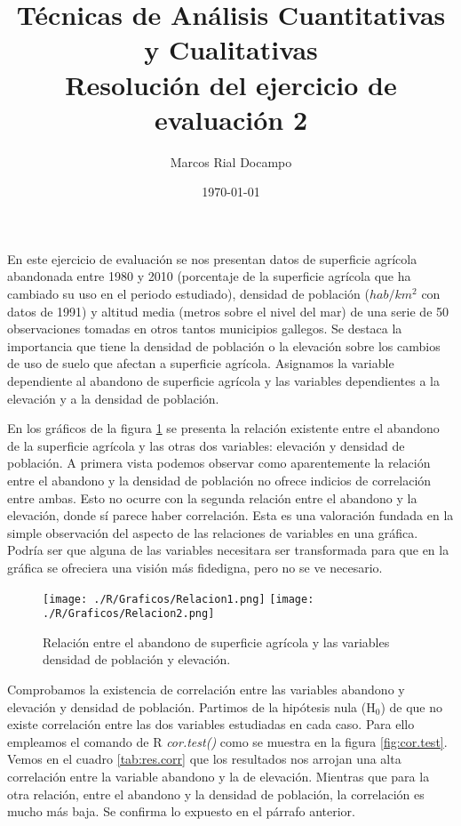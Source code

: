 \documentclass[11pt,a4paper]{article}
\author{Marcos Rial Docampo}
\title{Técnicas de Análisis Cuantitativas y Cualitativas\\Resolución del ejercicio de evaluación 2}
\date{\small{\today}}
\begin{document}
\maketitle

En este ejercicio de evaluación se nos presentan datos de superficie agrícola abandonada entre 1980 y 2010 (porcentaje de la superficie agrícola que ha cambiado su uso en el periodo estudiado), densidad de población ($hab/km^{2}$ con datos de 1991) y altitud media (metros sobre el nivel del mar) de una serie de 50 observaciones tomadas en otros tantos municipios gallegos. Se destaca la importancia que tiene la densidad de población o la elevación sobre los cambios de uso de suelo que afectan a superficie agrícola. Asignamos la variable dependiente al abandono de superficie agrícola y las variables dependientes a la elevación y a la densidad de población.

En los gráficos de la figura \ref{fig:graficas} se presenta la relación existente entre el abandono de la superficie agrícola y las otras dos variables: elevación y densidad de población. A primera vista podemos observar como aparentemente la relación entre el abandono y la densidad de población no ofrece indicios de correlación entre ambas. Esto no ocurre con la segunda relación entre el abandono y la elevación, donde sí parece haber correlación. Esta es una valoración fundada en la simple observación del aspecto de las relaciones de variables en una gráfica. Podría ser que alguna de las variables necesitara ser transformada para que en la gráfica se ofreciera una visión más fidedigna, pero no se ve necesario.


\begin{figure}
	\centering
	\texttt{[image: ./R/Graficos/Relacion1.png]}
	\texttt{[image: ./R/Graficos/Relacion2.png]}
	\caption{Relación entre el abandono de superficie agrícola y las variables densidad de población y elevación.}
	\label{fig:graficas}
\end{figure}

Comprobamos la existencia de correlación entre las variables abandono y elevación y densidad de población. Partimos de la hipótesis nula (H$_0$) de que no existe correlación entre las dos variables estudiadas en cada caso. Para ello empleamos el comando de R \textit{cor.test()} como se muestra en la figura \ref{fig:cor.test}. Vemos en el cuadro \ref{tab:res.corr} que los resultados nos arrojan una alta correlación entre la variable abandono y la de elevación. Mientras que para la otra relación, entre el abandono y la densidad de población, la correlación es mucho más baja. Se confirma lo expuesto en el párrafo anterior.
\end{document}
